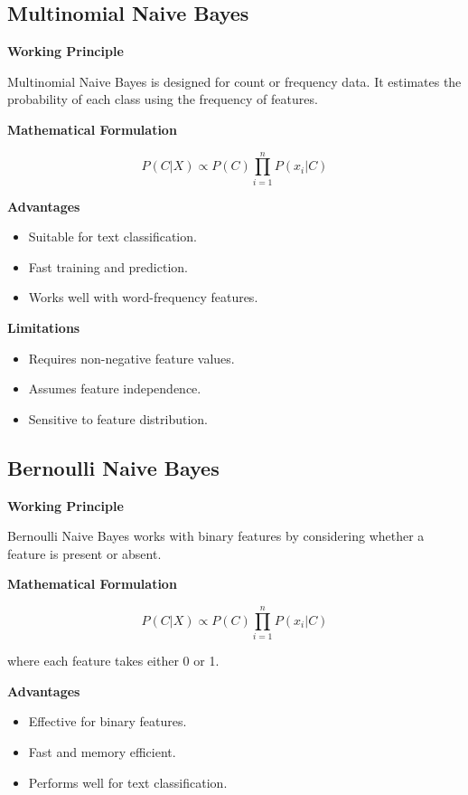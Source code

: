 \documentclass{article}
\begin{document}
\subsection{Multinomial Naive Bayes}

\textbf{Working Principle}

Multinomial Naive Bayes is designed for count or frequency data. It estimates the probability of each class using the frequency of features.

\textbf{Mathematical Formulation}

\[
P(C|X)\propto P(C)\prod_{i=1}^{n}P(x_i|C)
\]

\textbf{Advantages}

\begin{itemize}
\item Suitable for text classification.
\item Fast training and prediction.
\item Works well with word-frequency features.
\end{itemize}

\textbf{Limitations}

\begin{itemize}
\item Requires non-negative feature values.
\item Assumes feature independence.
\item Sensitive to feature distribution.
\end{itemize}

\subsection{Bernoulli Naive Bayes}

\textbf{Working Principle}

Bernoulli Naive Bayes works with binary features by considering whether a feature is present or absent.

\textbf{Mathematical Formulation}

\[
P(C|X)\propto P(C)\prod_{i=1}^{n}P(x_i|C)
\]

where each feature takes either 0 or 1.

\textbf{Advantages}

\begin{itemize}
\item Effective for binary features.
\item Fast and memory efficient.
\item Performs well for text classification.
\end{itemize}
\end{document}
